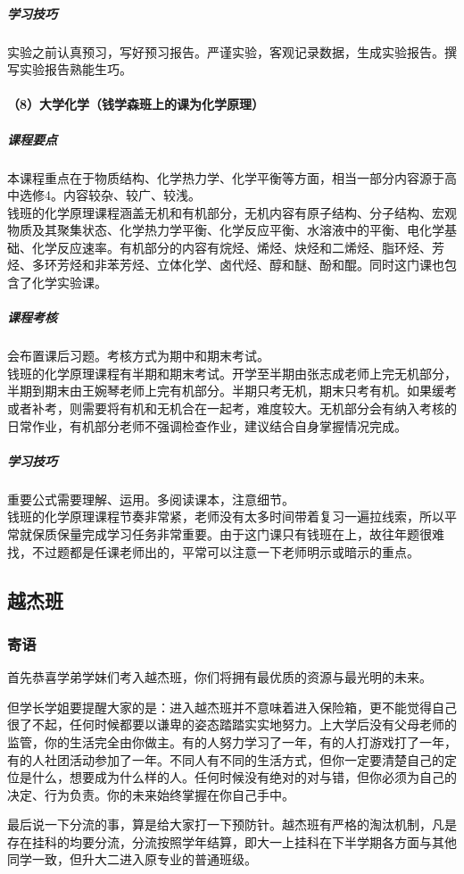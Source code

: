 \documentclass[
decoration,  %
]{qyxf-book}
\begin{document}
\subparagraph{学习技巧}
实验之前认真预习，写好预习报告。严谨实验，客观记录数据，生成实验报告。撰写实验报告熟能生巧。

\paragraph{（8）大学化学（钱学森班上的课为化学原理）}
\subparagraph{课程要点}
本课程重点在于物质结构、化学热力学、化学平衡等方面，相当一部分内容源于高中选修4。内容较杂、较广、较浅。\\
钱班的化学原理课程涵盖无机和有机部分，无机内容有原子结构、分子结构、宏观物质及其聚集状态、化学热力学平衡、化学反应平衡、水溶液中的平衡、电化学基础、化学反应速率。有机部分的内容有烷烃、烯烃、炔烃和二烯烃、脂环烃、芳烃、多环芳烃和非苯芳烃、立体化学、卤代烃、醇和醚、酚和醌。同时这门课也包含了化学实验课。

\subparagraph{课程考核}
会布置课后习题。考核方式为期中和期末考试。\\
钱班的化学原理课程有半期和期末考试。开学至半期由张志成老师上完无机部分，半期到期末由王婉琴老师上完有机部分。半期只考无机，期末只考有机。如果缓考或者补考，则需要将有机和无机合在一起考，难度较大。无机部分会有纳入考核的日常作业，有机部分老师不强调检查作业，建议结合自身掌握情况完成。

\subparagraph{学习技巧}
重要公式需要理解、运用。多阅读课本，注意细节。\\
钱班的化学原理课程节奏非常紧，老师没有太多时间带着复习一遍拉线索，所以平常就保质保量完成学习任务非常重要。由于这门课只有钱班在上，故往年题很难找，不过题都是任课老师出的，平常可以注意一下老师明示或暗示的重点。

\subsection{越杰班}\subsubsection{寄语}
首先恭喜学弟学妹们考入越杰班，你们将拥有最优质的资源与最光明的未来。

但学长学姐要提醒大家的是：进入越杰班并不意味着进入保险箱，更不能觉得自己很了不起，任何时候都要以谦卑的姿态踏踏实实地努力。上大学后没有父母老师的监管，你的生活完全由你做主。有的人努力学习了一年，有的人打游戏打了一年，有的人社团活动参加了一年。不同人有不同的生活方式，但你一定要清楚自己的定位是什么，想要成为什么样的人。任何时候没有绝对的对与错，但你必须为自己的决定、行为负责。你的未来始终掌握在你自己手中。

最后说一下分流的事，算是给大家打一下预防针。越杰班有严格的淘汰机制，凡是存在挂科的均要分流，分流按照学年结算，即大一上挂科在下半学期各方面与其他同学一致，但升大二进入原专业的普通班级。
\end{document}

